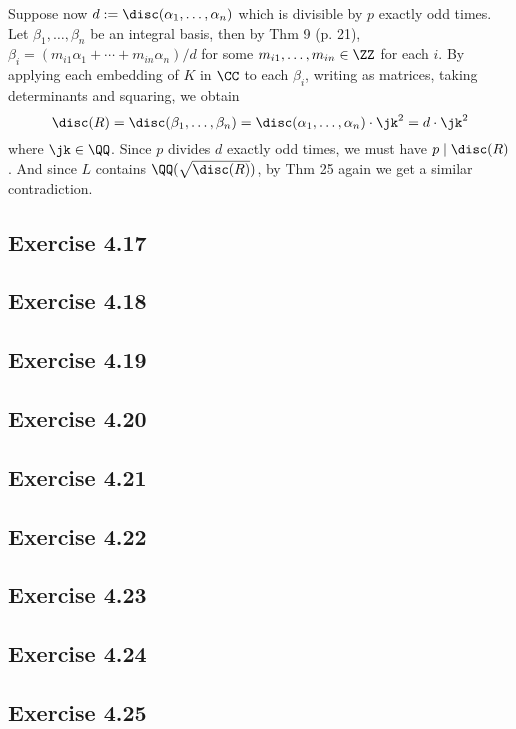 \documentclass[../Chapter.tex]{subfiles}
\begin{document}
Suppose now $d:=\disc(\alpha_1,\ldots,\alpha_n)$ which is divisible by $p$ exactly odd times. Let $\beta_1,\ldots,\beta_n$ be an integral basis, then by Thm 9 (p. 21), $\beta_i=(m_{i1}\alpha_1+\cdots+m_{in}\alpha_n)/d$ for some $m_{i1},\ldots,m_{in}\in\ZZ$ for each $i$. By applying each embedding of $K$ in $\CC$ to each $\beta_i$, writing as matrices, taking determinants and squaring, we obtain $$\disc(R)=\disc(\beta_1,\ldots,\beta_n)=\disc(\alpha_1,\ldots,\alpha_n)\cdot\jk^2=d\cdot\jk^2$$ where $\jk\in\QQ$. Since $p$ divides $d$ exactly odd times, we must have $p\mid\disc(R)$. And since $L$ contains $\QQ(\sqrt{\disc(R)})$, by Thm 25 again we get a similar contradiction.

\subsection*{Exercise 4.17}

\subsection*{Exercise 4.18}

\subsection*{Exercise 4.19}

\subsection*{Exercise 4.20}

\subsection*{Exercise 4.21}

\subsection*{Exercise 4.22}

\subsection*{Exercise 4.23}

\subsection*{Exercise 4.24}

\subsection*{Exercise 4.25}
\end{document}
